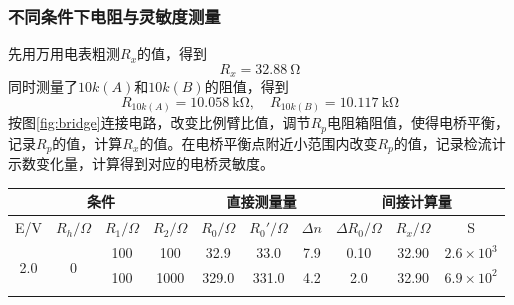 \documentclass[12pt]{article}
\begin{document}
\subsubsection{不同条件下电阻与灵敏度测量}
\quad 先用万用电表粗测$R_x$的值，得到
\[
    R_x = \SI{32.88}{\ohm} 
\]
\quad 同时测量了$10k(A)$和$10k(B)$的阻值，得到
\[
    R_{10k(A)} = \SI{10.058}{\kohm}, \quad R_{10k(B)} = \SI{10.117}{\kohm}
\]
\quad 按图\ref{fig:bridge}连接电路，改变比例臂比值，调节$R_p$电阻箱阻值，使得电桥平衡，记录$R_p$的值，计算$R_x$的值。在电桥平衡点附近小范围内改变$R_p$的值，记录检流计示数变化量，计算得到对应的电桥灵敏度。
\begin{table}[H]
    \centering
    \begin{tabular}{|cccc|ccc|ccc|}
        \hline
        \multicolumn{4}{|c|}{条件}                                                                                                                & \multicolumn{3}{c|}{直接测量量}                                                                          & \multicolumn{3}{c|}{间接计算量}                                                                                                                                                                \\ \hline
        \multicolumn{1}{|c|}{E/V}                  & \multicolumn{1}{c|}{$R_h/\Omega$}       & \multicolumn{1}{c|}{$R_1/\Omega$} & $R_2/\Omega$ & \multicolumn{1}{c|}{$R_0/\Omega$} & \multicolumn{1}{c|}{$R_0'/\Omega$} & $\Delta n$ & \multicolumn{1}{c|}{$\Delta R_0 /\Omega$} & \multicolumn{1}{c|}{$R_x/\Omega$}                                                                                          & S                \\ \hline
        \multicolumn{1}{|c|}{\multirow{5}{*}{2.0}} & \multicolumn{1}{c|}{\multirow{4}{*}{0}} & \multicolumn{1}{c|}{100}          & 100          & \multicolumn{1}{c|}{32.9}         & \multicolumn{1}{c|}{33.0}                          & 7.9        & \multicolumn{1}{c|}{0.10}                 & \multicolumn{1}{c|}{32.90}                                                                                                 & $2.6\times 10^3$ \\ \cline{3-10} 
        \multicolumn{1}{|c|}{}                     & \multicolumn{1}{c|}{}                   & \multicolumn{1}{c|}{100}          & 1000         & \multicolumn{1}{c|}{329.0}        & \multicolumn{1}{c|}{331.0}                         & 4.2        & \multicolumn{1}{c|}{2.0}                  & \multicolumn{1}{c|}{32.90}                                                                                                 & $6.9\times 10^2$ \\ \cline{3-10} 

\end{tabular}
\end{table}
\end{document}
